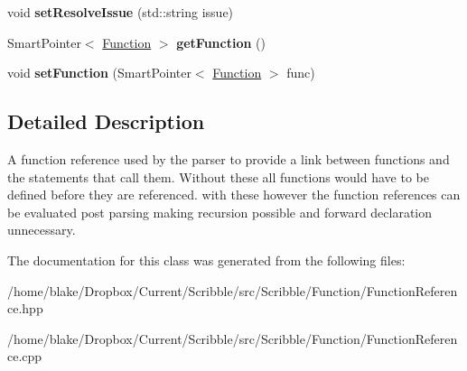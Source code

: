 \begin{DoxyCompactItemize}
\item 
\hypertarget{class_scribble_core_1_1_function_reference_ac081e81ae34f67451ae821b94f8a85d2}{void {\bfseries set\-Resolve\-Issue} (std\-::string issue)}\label{class_scribble_core_1_1_function_reference_ac081e81ae34f67451ae821b94f8a85d2}

\item 
\hypertarget{class_scribble_core_1_1_function_reference_a16a015b1d50b2d21431bf9e30e19e355}{Smart\-Pointer$<$ \hyperlink{class_a_p_i_1_1_function}{Function} $>$ {\bfseries get\-Function} ()}\label{class_scribble_core_1_1_function_reference_a16a015b1d50b2d21431bf9e30e19e355}

\item 
\hypertarget{class_scribble_core_1_1_function_reference_a4e3f9133a8ec183ad68e8d2ddba059c7}{void {\bfseries set\-Function} (Smart\-Pointer$<$ \hyperlink{class_a_p_i_1_1_function}{Function} $>$ func)}\label{class_scribble_core_1_1_function_reference_a4e3f9133a8ec183ad68e8d2ddba059c7}

\end{DoxyCompactItemize}


\subsection{Detailed Description}
A function reference used by the parser to provide a link between functions and the statements that call them. Without these all functions would have to be defined before they are referenced. with these however the function references can be evaluated post parsing making recursion possible and forward declaration unnecessary. 

The documentation for this class was generated from the following files\-:\begin{DoxyCompactItemize}
\item 
/home/blake/\-Dropbox/\-Current/\-Scribble/src/\-Scribble/\-Function/Function\-Reference.\-hpp\item 
/home/blake/\-Dropbox/\-Current/\-Scribble/src/\-Scribble/\-Function/Function\-Reference.\-cpp\end{DoxyCompactItemize}
